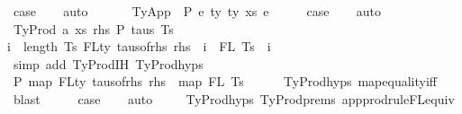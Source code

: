 \begin{isabellebody}
\ {\isacharquery}{\kern0pt}case\isanewline
\ \ \isamarkupfalse%
\ auto\isanewline
\ \ \isamarkupfalse%
\isanewline
{}\isamarkupfalse%
\isanewline
\ \ \isamarkupfalse%
\ {\isacharparenleft}{\kern0pt}TyApp\ {\isasymGamma}\ P\ e{}\ ty{}\ ty{}\ xs\ e{}{\isacharparenright}{\kern0pt}\isanewline
\ \ \isamarkupfalse%
\ \isamarkupfalse%
\ {\isacharquery}{\kern0pt}case\isanewline
\ \ \isamarkupfalse%
\ auto\isanewline
\ \ \isamarkupfalse%
\isanewline
{}\isamarkupfalse%
\isanewline
\ \ \isamarkupfalse%
\ {\isacharparenleft}{\kern0pt}TyProd\ a\ xs\ rhs\ P\ taus\ Ts\ {\isasymGamma}{\isacharparenright}{\kern0pt}\isanewline
\ \ \isamarkupfalse%
{\isachardoublequoteopen}{\isasymforall}i\ {\isacharless}{\kern0pt}\ length\ Ts{\isachardot}{\kern0pt}\ FLty\ {\isacharparenleft}{\kern0pt}taus{\isacharunderscore}{\kern0pt}of{\isacharunderscore}{\kern0pt}rhs\ rhs\ {\isacharbang}{\kern0pt}\ i{\isacharparenright}{\kern0pt}\ {\isacharequal}{\kern0pt}\ FL\ {\isacharparenleft}{\kern0pt}Ts\ {\isacharbang}{\kern0pt}\ i{\isacharparenright}{\kern0pt}{\isachardoublequoteclose}\isanewline
\ \ \ \ \ \isamarkupfalse%
\ {\isacharparenleft}{\kern0pt}simp\ add{\isacharcolon}{\kern0pt}\ TyProd{\isachardot}{\kern0pt}IH\ TyProd{\isachardot}{\kern0pt}hyps{\isacharparenleft}{\kern0pt}{}{\isacharparenright}{\kern0pt}{\isacharparenright}{\kern0pt}\isanewline
\ \ \isamarkupfalse%
\ \isamarkupfalse%
\ P{}{\isacharcolon}{\kern0pt}\ {\isachardoublequoteopen}map\ FLty\ {\isacharparenleft}{\kern0pt}taus{\isacharunderscore}{\kern0pt}of{\isacharunderscore}{\kern0pt}rhs\ rhs{\isacharparenright}{\kern0pt}\ {\isacharequal}{\kern0pt}\ map\ FL\ Ts{\isachardoublequoteclose}\isanewline
\ \ \ \ \isamarkupfalse%
\ TyProd{\isachardot}{\kern0pt}hyps{\isacharparenleft}{\kern0pt}{}{\isacharcomma}{\kern0pt}{}{\isacharparenright}{\kern0pt}\ map{\isacharunderscore}{\kern0pt}equality{\isacharunderscore}{\kern0pt}iff\ \isamarkupfalse%
\ blast\isanewline
\ \ \isamarkupfalse%
\ \isamarkupfalse%
\ {\isacharquery}{\kern0pt}case\isanewline
\ \ \isamarkupfalse%
\ auto\isanewline
\ \ \ \isamarkupfalse%
\ TyProd{\isachardot}{\kern0pt}hyps{\isacharparenleft}{\kern0pt}{}{\isacharparenright}{\kern0pt}\ TyProd{\isachardot}{\kern0pt}prems\ app{\isacharunderscore}{\kern0pt}prodrule{\isacharunderscore}{\kern0pt}FL{\isacharunderscore}{\kern0pt}equiv\ \isamarkupfalse%

\end{isabellebody}
